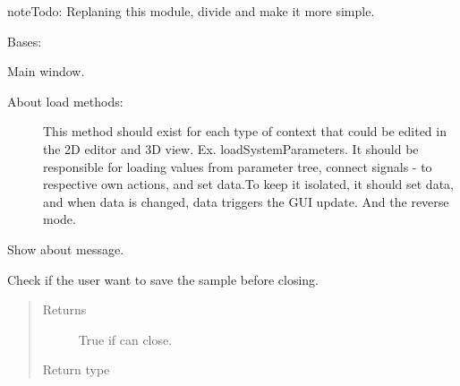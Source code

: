 \documentclass[a4paper,10pt,english]{sphinxmanual}
\begin{document}
\begin{sphinxadmonition}{note}{\label{autodoc/mrsprint/mrsprint:index-0}Todo:}
Replaning this module, divide and make it more simple.
\end{sphinxadmonition}

\begin{fulllineitems}
\label{\detokenize{autodoc/mrsprint/mrsprint:mrsprint.mainwindow.MainWindow}}
Bases: 

Main window.
\begin{description}
\item[{About load methods:}] \leavevmode
This method should exist for each type of context that could be edited
in the 2D editor and 3D view. Ex. loadSystemParameters. It should be
responsible for loading values from parameter tree, connect signals -
to respective own actions, and set data.To keep it isolated, it should
set data, and when data is changed, data triggers the GUI update.
And the reverse mode.

\end{description}

\begin{fulllineitems}
\label{\detokenize{autodoc/mrsprint/mrsprint:mrsprint.mainwindow.MainWindow.about}}
Show about message.

\end{fulllineitems}


\begin{fulllineitems}
\label{\detokenize{autodoc/mrsprint/mrsprint:mrsprint.mainwindow.MainWindow.canClose}}
Check if the user want to save the sample before closing.
\begin{quote}\begin{description}
\item[{Returns}] \leavevmode
True if can close.

\item[{Return type}] \leavevmode
{}


\end{description}
\end{quote}
\end{fulllineitems}
\end{fulllineitems}
\end{document}
